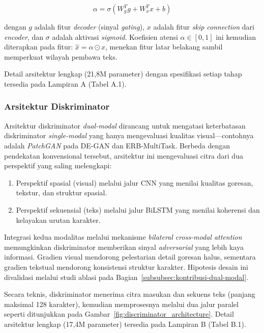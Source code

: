 \documentclass[12pt,a4paper]{article}
\begin{document}
\begin{equation}
  \alpha = \sigma(W_g^T g + W_x^T x + b)
  \label{eq:IV.1}
\end{equation}

\noindent dengan $g$ adalah fitur \textit{decoder} (sinyal \textit{gating}), $x$ adalah fitur \textit{skip connection} dari \textit{encoder}, dan $\sigma$ adalah aktivasi \textit{sigmoid}. Koefisien atensi $\alpha \in [0,1]$ ini kemudian diterapkan pada fitur: $\hat{x} = \alpha \odot x$, menekan fitur latar belakang sambil memperkuat wilayah pembawa teks.

Detail arsitektur lengkap (21,8M parameter) dengan spesifikasi setiap tahap tersedia pada Lampiran A (Tabel A.1).


\subsubsection{Arsitektur Diskriminator}
\label{subsubsec:diskriminator-dual-modal}

Arsitektur diskriminator \textit{dual-modal} dirancang untuk mengatasi keterbatasan diskriminator \textit{single-modal} yang hanya mengevaluasi kualitas visual---contohnya adalah \textit{PatchGAN} pada DE-GAN dan ERB-MultiTask. Berbeda dengan pendekatan konvensional tersebut, arsitektur ini mengevaluasi citra dari dua perspektif yang saling melengkapi:
\begin{enumerate}[label=(\arabic*), nosep, leftmargin=2em]
  \item Perspektif spasial (visual) melalui jalur CNN yang menilai kualitas goresan, tekstur, dan struktur spasial.
  \item Perspektif sekuensial (teks) melalui jalur BiLSTM yang menilai koherensi dan kelayakan urutan karakter.
\end{enumerate}

\noindent Integrasi kedua modalitas melalui mekanisme \textit{bilateral cross-modal attention} memungkinkan diskriminator memberikan sinyal \textit{adversarial} yang lebih kaya informasi. Gradien visual mendorong pelestarian detail goresan halus, sementara gradien tekstual mendorong konsistensi struktur karakter. Hipotesis desain ini divalidasi melalui studi ablasi pada Bagian~\ref{subsubsec:kontribusi-dual-modal}.

Secara teknis, diskriminator menerima citra masukan dan sekuens teks (panjang maksimal 128 karakter), kemudian memprosesnya melalui dua jalur paralel seperti ditunjukkan pada Gambar~\ref{fig:discriminator_architecture}. Detail arsitektur lengkap (17,4M parameter) tersedia pada Lampiran B (Tabel B.1).
\end{document}
